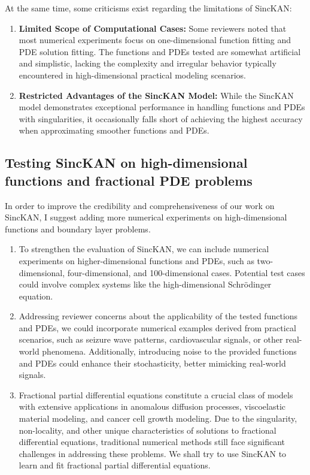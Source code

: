 At the same time, some criticisms exist regarding the limitations of SincKAN:
    \begin{enumerate}
    \item \textbf{Limited Scope of Computational Cases:} Some reviewers noted that most numerical experiments focus on one-dimensional function fitting and PDE solution fitting. The functions and PDEs tested are somewhat artificial and simplistic, lacking the complexity and irregular behavior typically encountered in high-dimensional practical modeling scenarios.

    \item \textbf{Restricted Advantages of the SincKAN Model:} While the SincKAN model demonstrates exceptional performance in handling functions and PDEs with singularities, it occasionally falls short of achieving the highest accuracy when approximating smoother functions and PDEs.
\end{enumerate}


\subsection{Testing SincKAN on high-dimensional functions and fractional PDE problems}
In order to improve the credibility and comprehensiveness of our work on SincKAN, I suggest adding more numerical experiments on high-dimensional functions and boundary layer problems. 
\begin{enumerate}
    \item To strengthen the evaluation of SincKAN, we can include numerical experiments on higher-dimensional functions and PDEs, such as two-dimensional, four-dimensional, and 100-dimensional cases. Potential test cases could involve complex systems like the high-dimensional Schrödinger equation.

    \item Addressing reviewer concerns about the applicability of the tested functions and PDEs, we could incorporate numerical examples derived from practical scenarios, such as seizure wave patterns, cardiovascular signals, or other real-world phenomena. Additionally, introducing noise to the provided functions and PDEs could enhance their stochasticity, better mimicking real-world signals.

    \item Fractional partial differential equations constitute a crucial class of models with extensive applications in anomalous diffusion processes, viscoelastic material modeling, and cancer cell growth modeling. Due to the singularity, non-locality, and other unique characteristics of solutions to fractional differential equations, traditional numerical methods still face significant challenges in addressing these problems. We shall try to use SincKAN to learn and fit fractional partial differential equations.
\end{enumerate}

